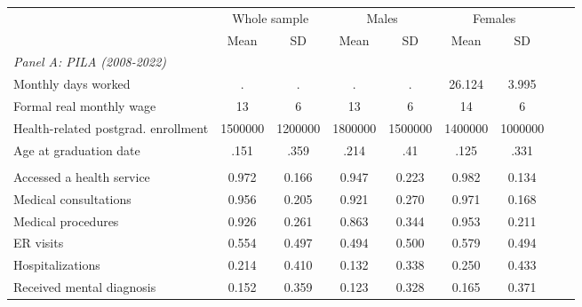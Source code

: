 \begin{tabular}{lcccccc}
\toprule
& \multicolumn{2}{c}{Whole sample} & \multicolumn{2}{c}{Males}     & \multicolumn{2}{c}{Females} \\
\cmidrule(l){2-3} \cmidrule(l){4-5} \cmidrule(l){6-7}
& Mean & SD & Mean & SD & Mean & SD \\
\midrule
\multicolumn{9}{l}{\textit{Panel A: PILA (2008-2022)}} \\
Monthly days worked & . & . & . & . & 26.124 & 3.995 \\ 
Formal real monthly wage & 13 & 6 & 13 & 6 & 14 & 6 \\ 
Health-related postgrad. enrollment & 1500000 & 1200000 & 1800000 & 1500000 & 1400000 & 1000000 \\ 
Age at graduation date & .151 & .359 & .214 & .41 & .125 & .331 \\ \addlinespace
\multicolumn{9}{l}{\textit{Panel B: RIPS (2009-2022)}} \\
Accessed a health service & 0.972 & 0.166 & 0.947 & 0.223 & 0.982 & 0.134 \\ 
Medical consultations & 0.956 & 0.205 & 0.921 & 0.270 & 0.971 & 0.168 \\ 
Medical procedures & 0.926 & 0.261 & 0.863 & 0.344 & 0.953 & 0.211 \\ 
ER visits & 0.554 & 0.497 & 0.494 & 0.500 & 0.579 & 0.494 \\ 
Hospitalizations & 0.214 & 0.410 & 0.132 & 0.338 & 0.250 & 0.433 \\ 
Received mental diagnosis & 0.152 & 0.359 & 0.123 & 0.328 & 0.165 & 0.371 \\ 
\bottomrule
\end{tabular}
